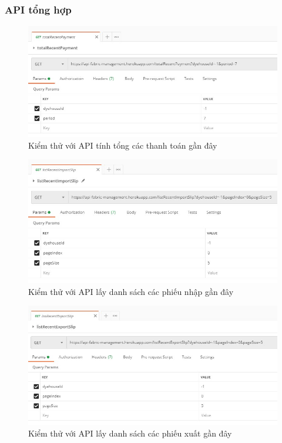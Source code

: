 \subsubsection{API tổng hợp}
\begin{figure}[H]
    \begin{center}
        \includegraphics[width=12cm]{Image/API/35_totalRecentPayment.jpg}
        \caption{Kiểm thử với API tính tổng các thanh toán gần đây}
        \label{totalRecentPayment}
    \end{center}
\end{figure}
\begin{figure}[H]
    \begin{center}
        \includegraphics[width=12cm]{Image/API/36_listRecentImportSlip.jpg}
        \caption{Kiểm thử với API lấy danh sách các phiếu nhập gần đây}
        \label{listRecentImportSlip}
    \end{center}
\end{figure}
\begin{figure}[H]
    \begin{center}
        \includegraphics[width=12cm]{Image/API/37_listRecentExportSlip.jpg}
        \caption{Kiểm thử với API lấy danh sách các phiếu xuất gần đây}
        \label{listRecentExportSlip}
    \end{center}
\end{figure}

